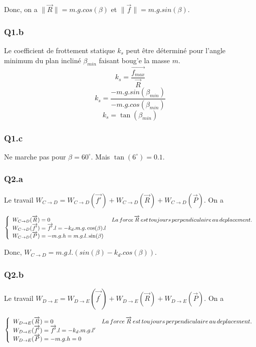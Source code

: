 \documentclass[]{book}
\theoremstyle{definition}
\begin{document}
Donc, on a $ \|\overrightarrow{R}\| = m.g.cos(\beta)$ et $\|\overrightarrow{f}\| = m.g.sin(\beta)$.

\subsubsection{Q1.b}
Le coefficient de frottement statique $k_s$ peut \^etre d\'etermin\'e pour l'angle minimum du plan inclin\'e $\beta_{min}$ faisant boug'e la masse $m$.\\
$$k_s = \frac{\overrightarrow{f_{max}}}{\overrightarrow{R}}$$
$$k_s = \frac{-m.g.sin(\beta_{min})}{-m.g.cos(\beta_{min})}$$
$$k_s = \tan(\beta_{min})$$

\subsubsection{Q1.c}
Ne marche pas pour $\beta = 60^\circ$. Mais $\tan(6^\circ) = 0.1$.

\subsubsection{Q2.a}
Le travail $W_{C \to D} = W_{C \to D}(\overrightarrow{f\prime}) + W_{C \to D}(\overrightarrow{R}) + W_{C \to D}(\overrightarrow{P})$. On a 

$$
\left\{
\begin{array}{l l}
W_{C \to D}(\overrightarrow{R}) = 0 & La\, force\, \overrightarrow{R}\, est\, toujours\, perpendiculaire\, au\, deplacement.\\
W_{C \to D}(\overrightarrow{f^\prime}) = \overrightarrow{f^\prime}.l = -k_d.m.g.\cos(\beta).l & \\
W_{C \to D}(\overrightarrow{P}) = -m.g.h = m.g.l.\sin(\beta) & \\
\end{array}
\right. 
$$

Donc, $W_{C \to D} = m.g.l.(sin(\beta) - k_d.cos(\beta))$.


\subsubsection{Q2.b}
Le travail $W_{D \to E} = W_{D \to E}(\overrightarrow{f^\prime}) + W_{D \to E}(\overrightarrow{R}) + W_{D \to E}(\overrightarrow{P})$. On a 

$$
\left\{
\begin{array}{l l}
W_{D \to E}(\overrightarrow{R}) = 0 & La\, force\, \overrightarrow{R}\, est\, toujours\, perpendiculaire\, au\, deplacement.\\
W_{D \to E}(\overrightarrow{f^\prime}) = \overrightarrow{f^\prime}.l = -k_d.m.g.l^\prime & \\
W_{D \to E}(\overrightarrow{P}) = -m.g.h = 0 & \\
\end{array}
\right. 
$$
\end{document}
